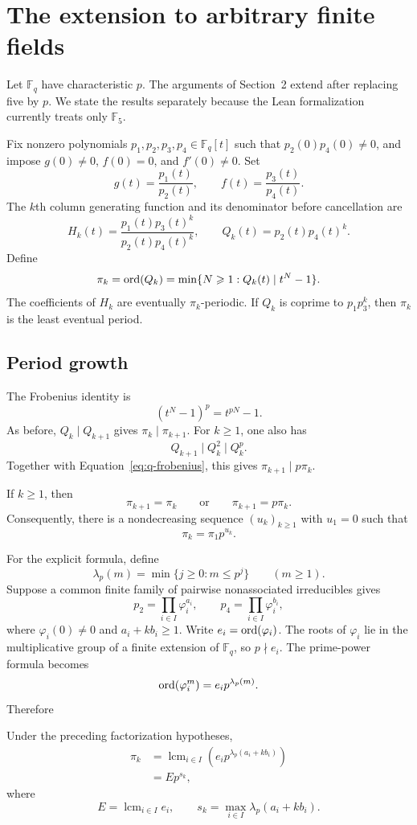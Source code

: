 \section{The extension to arbitrary finite fields}

Let $\mathbb F_q$ have characteristic $p$. The arguments of Section~2 extend
after replacing five by $p$. We state the results separately because the Lean
formalization currently treats only $\mathbb F_5$.

Fix nonzero polynomials $p_1,p_2,p_3,p_4\in\mathbb F_q[t]$ such that
$p_2(0)p_4(0)\ne0$, and impose $g(0)\ne0$, $f(0)=0$, and $f'(0)\ne0$. Set
\[
g(t)=\frac{p_1(t)}{p_2(t)},
\qquad
f(t)=\frac{p_3(t)}{p_4(t)}.
\]
The $k$th column generating function and its denominator before cancellation
are
\[
H_k(t)=\frac{p_1(t)p_3(t)^k}{p_2(t)p_4(t)^k},
\qquad
Q_k(t)=p_2(t)p_4(t)^k.
\]
Define
\[
\pi_k=\operatorname{ord}(Q_k)
=\min\{N\geqslant1:Q_k(t)\mid t^N-1\}.
\]
The coefficients of $H_k$ are eventually $\pi_k$-periodic. If
$Q_k$ is coprime to $p_1p_3^k$, then $\pi_k$ is the least eventual period.

\subsection{Period growth}

The Frobenius identity is
\begin{equation}\label{eq:q-frobenius}
(t^N-1)^p=t^{pN}-1.
\end{equation}
As before, $Q_k\mid Q_{k+1}$ gives $\pi_k\mid\pi_{k+1}$. For
$k\geqslant1$, one also has
\[
Q_{k+1}\mid Q_k^2\mid Q_k^p.
\]
Together with Equation~\eqref{eq:q-frobenius}, this gives
$\pi_{k+1}\mid p\pi_k$.

\begin{prop}\label{prop:q-ratio}
If $k\geqslant1$, then
\[
\pi_{k+1}=\pi_k
\qquad\text{or}\qquad
\pi_{k+1}=p\pi_k.
\]
Consequently, there is a nondecreasing sequence $(u_k)_{k\geqslant1}$ with
$u_1=0$ such that
\[
\pi_k=\pi_1p^{u_k}.
\]
\end{prop}

For the explicit formula, define
\[
\lambda_p(m)=\min\{j\geqslant0:m\leqslant p^j\}
\qquad(m\geqslant1).
\]
Suppose a common finite family of pairwise nonassociated irreducibles gives
\[
p_2=\prod_{i\in I}\varphi_i^{a_i},
\qquad
p_4=\prod_{i\in I}\varphi_i^{b_i},
\]
where $\varphi_i(0)\ne0$ and $a_i+kb_i\geqslant1$. Write
$e_i=\operatorname{ord}(\varphi_i)$. The roots of $\varphi_i$ lie in the multiplicative
group of a finite extension of $\mathbb F_q$, so $p\nmid e_i$. The
prime-power formula becomes
\[
\operatorname{ord}(\varphi_i^m)=e_i p^{\lambda_p(m)}.
\]
Therefore
\begin{prop}\label{prop:q-formula}
Under the preceding factorization hypotheses,
\begin{align*}
\pi_k
&=\mathop{\operatorname{lcm}}_{i\in I}
  \left(e_i p^{\lambda_p(a_i+kb_i)}\right)\\
&=E p^{s_k},
\end{align*}
where
\[
E=\mathop{\operatorname{lcm}}_{i\in I}e_i,
\qquad
s_k=\max_{i\in I}\lambda_p(a_i+kb_i).
\]
\end{prop}


